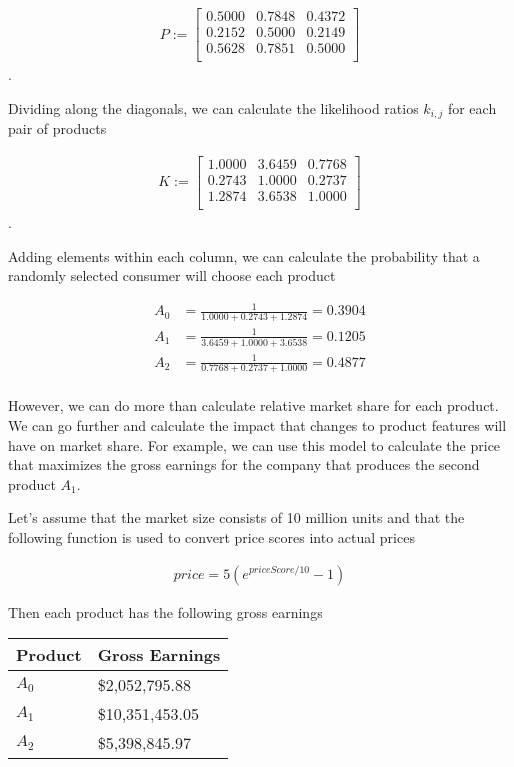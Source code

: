 \documentclass[]{article}
\begin{document}
\begin{align*}
P := \begin{bmatrix}
0.5000 & 0.7848 & 0.4372\\
0.2152 & 0.5000 & 0.2149\\
0.5628 & 0.7851 & 0.5000\\
\end{bmatrix}
\end{align*}.

Dividing along the diagonals, we can calculate the likelihood ratios
\(k_{i,j}\) for each pair of products

\begin{align*}
K := \begin{bmatrix}
1.0000 & 3.6459 & 0.7768\\
0.2743 & 1.0000 & 0.2737\\
1.2874 & 3.6538 & 1.0000\\
\end{bmatrix}
\end{align*}.

Adding elements within each column, we can calculate the probability
that a randomly selected consumer will choose each product

\begin{align*}
A_0 &= \frac{1}{ 1.0000 + 0.2743 + 1.2874 } = 0.3904\\
A_1 &= \frac{1}{ 3.6459 + 1.0000 + 3.6538 } = 0.1205\\
A_2 &= \frac{1}{ 0.7768 + 0.2737 + 1.0000 } = 0.4877\\
\end{align*}

However, we can do more than calculate relative market share for each
product. We can go further and calculate the impact that changes to
product features will have on market share. For example, we can use this
model to calculate the price that maximizes the gross earnings for the
company that produces the second product \(A_1\).

Let's assume that the market size consists of 10 million units and that
the following function is used to convert price scores into actual
prices

\begin{align*}
price = 5 (e^{priceScore/10} - 1)
\end{align*}

Then each product has the following gross earnings

\begin{longtable}[]{@{}ll@{}}
\toprule
Product & Gross Earnings\tabularnewline
\midrule
\endhead
\(A_0\) & \$2,052,795.88\tabularnewline
\(A_1\) & \$10,351,453.05\tabularnewline
\(A_2\) & \$5,398,845.97\tabularnewline
\bottomrule
\end{longtable}
\end{document}
